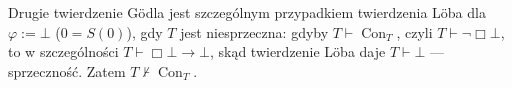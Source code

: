 \begin{uwaga}\label{res:13:2}
Drugie twierdzenie Gödla jest szczególnym przypadkiem twierdzenia Löba dla $\varphi:=\bot$ ($0=S(0)$), gdy $T$ jest niesprzeczna: gdyby $T\vdash\operatorname{Con}_T$, czyli $T\vdash\neg\Box\bot$, to w szczególności $T\vdash\Box\bot\to\bot$, skąd twierdzenie Löba daje $T\vdash\bot$ --- sprzeczność. Zatem $T\nvdash\operatorname{Con}_T$.
\end{uwaga}

